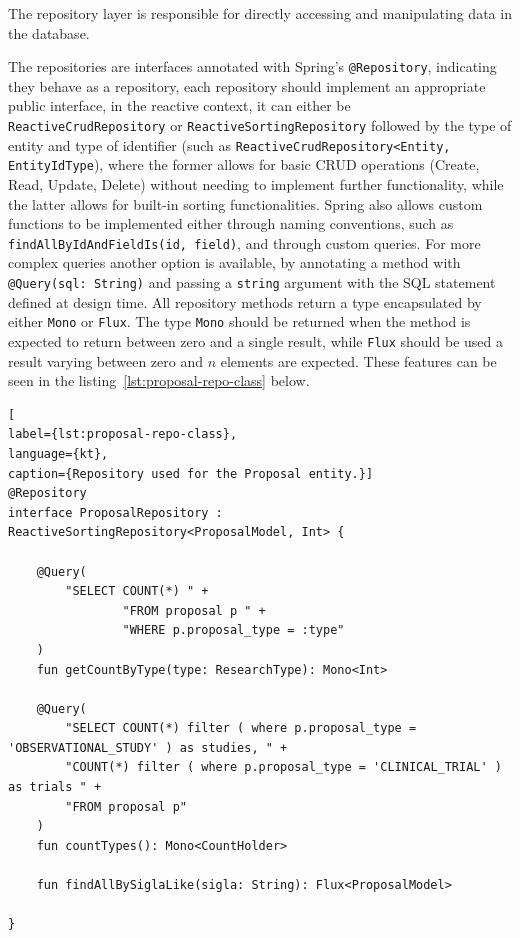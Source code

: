 The repository layer is responsible for directly accessing and manipulating data in the database. 


The repositories are interfaces annotated with Spring's \lstinline{@Repository}, indicating they behave as a repository, each repository should implement an appropriate public interface, in the reactive context, it can either be \lstinline{ReactiveCrudRepository} or \lstinline{ReactiveSortingRepository} followed by the type of entity and type of identifier (such as \lstinline{ReactiveCrudRepository<Entity, EntityIdType}), where the former allows for basic CRUD operations (Create, Read, Update, Delete) without needing to implement further functionality, while the latter allows for built-in sorting functionalities. Spring also allows custom functions to be implemented either through naming conventions, such as \lstinline{findAllByIdAndFieldIs(id, field)}, and through custom queries. For more complex queries another option is available, by annotating a method with \lstinline{@Query(sql: String)} and passing a \lstinline{string} argument with the SQL statement defined at design time. All repository methods return a type encapsulated by either \lstinline{Mono} or \lstinline{Flux}. The type \lstinline{Mono} should be returned when the method is expected to return between zero and a single result, while \lstinline{Flux} should be used a result varying between zero and $n$ elements are expected. These features can be seen in the listing~\ref{lst:proposal-repo-class} below.

\begin{lstlisting}[
label={lst:proposal-repo-class},
language={kt},
caption={Repository used for the Proposal entity.}]
@Repository
interface ProposalRepository : ReactiveSortingRepository<ProposalModel, Int> {

    @Query(
        "SELECT COUNT(*) " +
                "FROM proposal p " +
                "WHERE p.proposal_type = :type"
    )
    fun getCountByType(type: ResearchType): Mono<Int>

    @Query(
        "SELECT COUNT(*) filter ( where p.proposal_type = 'OBSERVATIONAL_STUDY' ) as studies, " +
        "COUNT(*) filter ( where p.proposal_type = 'CLINICAL_TRIAL' ) as trials " +
        "FROM proposal p"
    )
    fun countTypes(): Mono<CountHolder>
    
    fun findAllBySiglaLike(sigla: String): Flux<ProposalModel>

}    
\end{lstlisting}

